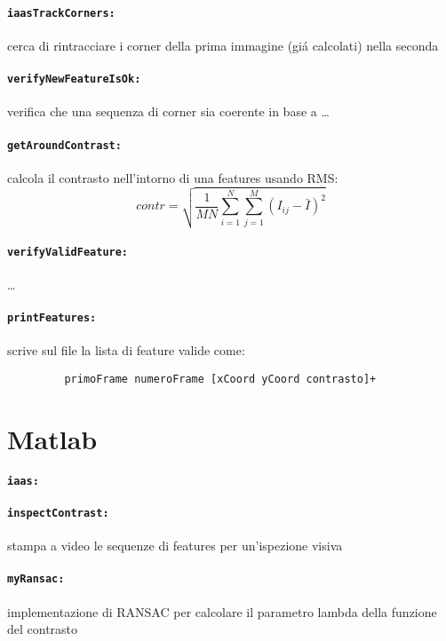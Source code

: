 \documentclass[12pt]{report}
\begin{document}
\paragraph*{\verb_iaasTrackCorners:_} cerca di rintracciare i corner della prima immagine (gi\'a calcolati) nella seconda

\paragraph*{\verb_verifyNewFeatureIsOk:_} verifica che una sequenza di corner sia coerente in base a \dots

\paragraph*{\verb_getAroundContrast:_} calcola il contrasto nell'intorno di una features usando RMS: $$contr = \sqrt{\frac{1}{MN}\sum_{i=1}^N\sum_{j=1}^M(I_{ij}-\bar{I})^2}$$

\paragraph*{\verb_verifyValidFeature:_} \dots


\paragraph*{\verb_printFeatures:_} scrive sul file la lista di feature valide come:
\begin{verbatim}
	     primoFrame numeroFrame [xCoord yCoord contrasto]+
\end{verbatim}

\section{Matlab}

\paragraph*{\verb_iaas:_}

\paragraph*{\verb_inspectContrast:_} stampa a video le sequenze di features per un'ispezione visiva

\paragraph*{\verb_myRansac:_} implementazione di RANSAC per calcolare il parametro lambda della funzione del contrasto
\end{document}
